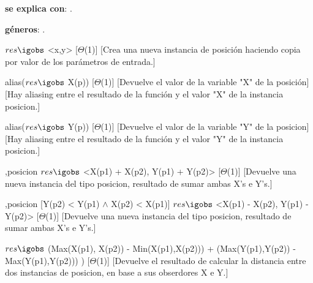 \begin{Interfaz}
	
	\textbf{se explica con}: .
	
	\textbf{géneros}: .
	
	
	{$res \igobs$ <x,y>}
	[$\Theta$(1)]
	[Crea una nueva instancia de posición haciendo copia por valor de los parámetros de entrada.]
	
	{alias($res \igobs$ X(p))}
	[$\Theta$(1)]
	[Devuelve el valor de la variable "X" de la posición]
	[Hay aliasing entre el resultado de la función y el valor "X" de la instancia posicion.]
	
	{alias($res \igobs$ Y(p))}
	[$\Theta$(1)]
	[Devuelve el valor de la variable "Y" de la posicion]
	[Hay aliasing entre el resultado de la función y el valor "Y" de la instancia posicion.]
	
	{,}{posicion}
	{$res \igobs$ <X(p1) + X(p2), Y(p1) + Y(p2)>}
	[$\Theta$(1)]
	[Devuelve una nueva instancia del tipo posicion, resultado de sumar ambas X's e Y's.]
	
	{,}{posicion}
	[Y(p2) < Y(p1) $\land$ X(p2) < X(p1)]
	{$res \igobs$ <X(p1) - X(p2), Y(p1) - Y(p2)>}
	[$\Theta$(1)]
	[Devuelve una nueva instancia del tipo posicion, resultado de sumar ambas X's e Y's.]
	
	{$res  \igobs$ (Max(X(p1), X(p2)) - Min(X(p1),X(p2))) + (Max(Y(p1),Y(p2)) - Max(Y(p1),Y(p2))) )}
	[$\Theta$(1)]
	[Devuelve el resultado de calcular la distancia entre dos instancias de posicion, en base a sus obserdores X e Y.]
	
\end{Interfaz}

